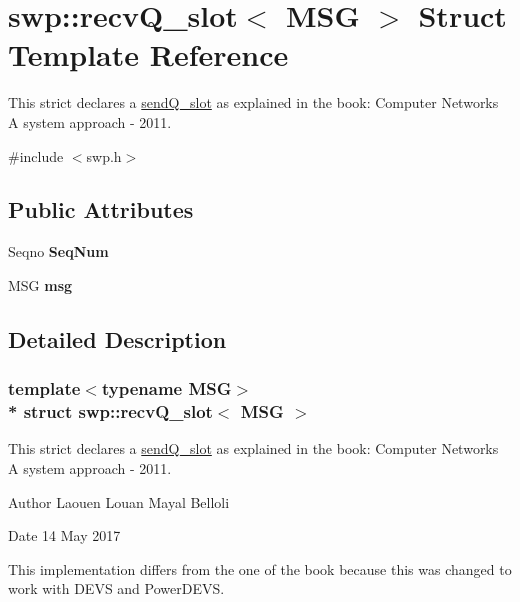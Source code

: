 \hypertarget{structswp_1_1recvQ__slot}{}\section{swp\+:\+:recv\+Q\+\_\+slot$<$ M\+SG $>$ Struct Template Reference}
\label{structswp_1_1recvQ__slot}


This strict declares a \hyperlink{structswp_1_1sendQ__slot}{send\+Q\+\_\+slot} as explained in the book\+: Computer Networks A system approach -\/ 2011.  




{\ttfamily \#include $<$swp.\+h$>$}

\subsection*{Public Attributes}
\begin{DoxyCompactItemize}
\item 
Seqno {\bfseries Seq\+Num}\hypertarget{structswp_1_1recvQ__slot_a4a2c4cf9141945c17a8f8f786e2c4af6}{}\label{structswp_1_1recvQ__slot_a4a2c4cf9141945c17a8f8f786e2c4af6}

\item 
M\+SG {\bfseries msg}\hypertarget{structswp_1_1recvQ__slot_a4df4f027822cffdb873cc49eb2d55619}{}\label{structswp_1_1recvQ__slot_a4df4f027822cffdb873cc49eb2d55619}

\end{DoxyCompactItemize}


\subsection{Detailed Description}
\subsubsection*{template$<$typename M\+SG$>$\\*
struct swp\+::recv\+Q\+\_\+slot$<$ M\+S\+G $>$}

This strict declares a \hyperlink{structswp_1_1sendQ__slot}{send\+Q\+\_\+slot} as explained in the book\+: Computer Networks A system approach -\/ 2011. 

\begin{DoxyAuthor}{Author}
Laouen Louan Mayal Belloli 
\end{DoxyAuthor}
\begin{DoxyDate}{Date}
14 May 2017
\end{DoxyDate}
This implementation differs from the one of the book because this was changed to work with D\+E\+VS and Power\+D\+E\+VS.


